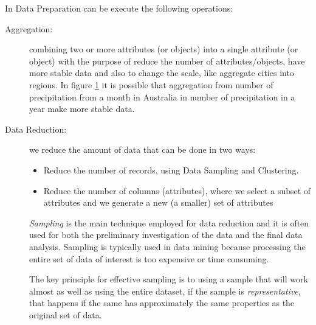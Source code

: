 In Data Preparation can be execute the following operations:
\begin{description}
    \item [Aggregation: ] combining two or more attributes (or objects) into a single attribute (or object)
                          with the purpose of reduce the number of attributes/objects, have more stable
                          data and also to change the scale, like aggregate cities into regions.\newline
                          In figure \ref{img:stableData} it is possible that aggregation from number of precipitation
                          from a month in Australia in number of precipitation in a year make more stable data.
                          \begin{figure}
                            
                              \label{img:stableData}
                          \end{figure}
    \item [Data Reduction: ] we reduce the amount of data that can be done in two ways:
                             \begin{itemize}
                                \item Reduce the number of records, using Data Sampling and Clustering.
                                \item Reduce the number of columns (attributes), where we select a subset
                                      of attributes and we generate a new (a smaller) set of attributes
                             \end{itemize}
                             \emph{Sampling} is the main technique employed for data reduction and it
                             is often used for both the preliminary investigation of the data 
                             and the final data analysis.\newline
                             Sampling is typically used in data mining because processing the entire set of data
                             of interest is too expensive or time consuming.

                             The key principle for effective sampling is to using a sample that will work
                             almost as well as using the entire dataset, if the sample is \emph{representative},
                             that happens if the same has approximately the same properties as 
                             the original set of data.
                            

\end{description}
